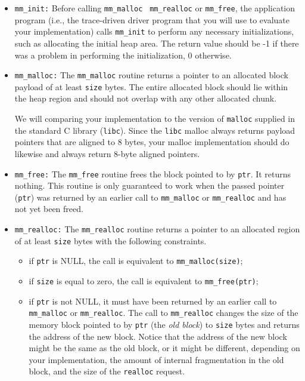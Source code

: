 \documentclass[11pt]{article}
\begin{document}
\begin{itemize}
\item {\tt mm\_init:} Before calling {\tt mm\_malloc} {\tt
mm\_realloc} or {\tt mm\_free}, the application program (i.e., the
trace-driven driver program that you will use to evaluate your
implementation) calls {\tt mm\_init} to perform any necessary
initializations, such as allocating the initial heap area.
The return value should be -1 if there was a problem in performing the
initialization, 0 otherwise.
  
\item {\tt mm\_malloc:} The {\tt mm\_malloc} routine returns a pointer
to an allocated block payload of at least {\tt size} bytes.  The
entire allocated block should lie within the heap region and should
not overlap with any other allocated chunk.

We will comparing your implementation to the version of {\tt malloc}
supplied in the standard C library ({\tt libc}). Since the 
{\tt libc} malloc always returns payload pointers that are 
aligned to 8 bytes, your malloc implementation should do likewise
and always return 8-byte aligned pointers.
  
\item {\tt mm\_free:} The {\tt mm\_free} routine frees the block
pointed to by {\tt ptr}.  It returns nothing. This routine is only
guaranteed to work when the passed pointer ({\tt ptr}) was returned by
an earlier call to {\tt mm\_malloc} or {\tt mm\_realloc} and has not
yet been freed.

\item {\tt mm\_realloc:} The {\tt mm\_realloc} routine returns a pointer
to an allocated region of at least {\tt size} bytes  with the following 
constraints. 

\begin{itemize}
\item if {\tt ptr} is NULL, the call is equivalent to {\tt mm\_malloc(size)}; 

\item if {\tt size} is equal to zero, the call is equivalent to 
{\tt mm\_free(ptr)};

\item if {\tt ptr} is not NULL, it must have been returned by an
earlier call to {\tt mm\_malloc} or {\tt mm\_realloc}. The call to
{\tt mm\_realloc} changes the size of the memory block pointed to by
{\tt ptr} (the {\em old block}) to {\tt size} bytes and returns the
address of the new block. Notice that the address of the new block
might be the same as the old block, or it might be different,
depending on your implementation, the amount of internal fragmentation
in the old block, and the size of the {\tt realloc} request.


\end{itemize}
\end{itemize}
\end{document}
